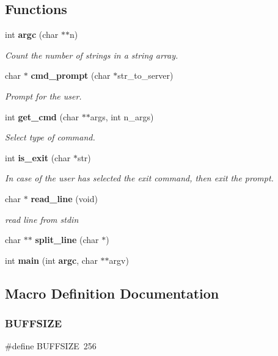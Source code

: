 \subsection*{Functions}
\begin{DoxyCompactItemize}
\item 
int \textbf{ argc} (char $\ast$$\ast$n)
\begin{DoxyCompactList}\small\item\em Count the number of strings in a string array. \end{DoxyCompactList}\item 
char $\ast$ \textbf{ cmd\+\_\+prompt} (char $\ast$str\+\_\+to\+\_\+server)
\begin{DoxyCompactList}\small\item\em Prompt for the user. \end{DoxyCompactList}\item 
int \textbf{ get\+\_\+cmd} (char $\ast$$\ast$args, int n\+\_\+args)
\begin{DoxyCompactList}\small\item\em Select type of command. \end{DoxyCompactList}\item 
int \textbf{ is\+\_\+exit} (char $\ast$str)
\begin{DoxyCompactList}\small\item\em In case of the user has selected the exit command, then exit the prompt. \end{DoxyCompactList}\item 
char $\ast$ \textbf{ read\+\_\+line} (void)
\begin{DoxyCompactList}\small\item\em read line from stdin \end{DoxyCompactList}\item 
char $\ast$$\ast$ \textbf{ split\+\_\+line} (char $\ast$)
\item 
int \textbf{ main} (int \textbf{ argc}, char $\ast$$\ast$argv)
\end{DoxyCompactItemize}


\subsection{Macro Definition Documentation}
\mbox{\label{bash_8c_a39912bfe2a55f30e269196f9141d845d}} 
\subsubsection{B\+U\+F\+F\+S\+I\+ZE}
{\footnotesize\ttfamily \#define B\+U\+F\+F\+S\+I\+ZE~256}

